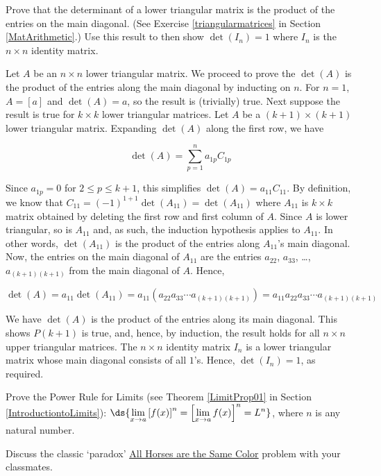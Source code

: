 \documentclass{ximera}
\begin{document}
\begin{problem}
    
Prove that the determinant of a lower triangular matrix is the product of the entries on the main diagonal.  (See Exercise \ref{triangularmatrices} in Section \ref{MatArithmetic}.)  Use this result to then show $\det\left(I_{n}\right) = 1$ where $I_{n}$ is the $n \times n$ identity matrix.

\begin{solution}
Let $A$ be an $n \times n$ lower triangular matrix.  We proceed to prove the $\det(A)$ is the product of the entries along the main diagonal by inducting on $n$.  For $n=1$, $A = [a]$ and $\det(A) = a$, so the result is (trivially) true.  Next suppose the result is true for $k \times k$ lower triangular matrices.  Let $A$ be a $(k+1) \times (k+1)$ lower triangular matrix.  Expanding $\det(A)$ along the first row, we have

\[ \det(A)  = \displaystyle{\sum_{p=1}^{n} a_{1p} C_{1p}} \]

Since $a_{1p} = 0$ for $2 \leq p \leq k+1$, this simplifies $\det(A) = a_{11}C_{11}$.  By definition, we know that $C_{11} = (-1)^{1+1} \det\left(A_{11}\right) =\det\left(A_{11}\right)$ where $A_{11}$ is $k \times k$  matrix obtained by deleting the first row and first column of $A$. Since $A$ is lower triangular, so is $A_{11}$ and, as such, the induction hypothesis applies to $A_{11}$. In other words, $\det\left(A_{11}\right)$ is the product of the entries along $A_{11}$'s main diagonal.  Now, the entries on the main diagonal of $A_{11}$ are the entries $a_{22}$, $a_{33}$, \ldots, $a_{(k+1)(k+1)}$ from the main diagonal of $A$.  Hence,

\[ \det(A) = a_{11} \det\left(A_{11}\right) = a_{11} \left(a_{22}a_{33} \cdots a_{(k+1)(k+1)} \right) = a_{11} a_{22}a_{33} \cdots a_{(k+1)(k+1)}\]

We have $\det(A)$ is the product of the entries along its main diagonal.  This shows $P(k+1)$ is true, and, hence, by induction, the result holds for all $n \times n$ upper triangular matrices. The $n \times n$ identity matrix $I_{n}$ is a lower triangular matrix whose main diagonal consists of all $1$'s.  Hence,  $\det\left(I_{n}\right) = 1$, as required.
\end{solution}
\end{problem}

\begin{problem}\label{limitpowerruleproof}
    Prove the Power Rule for Limits (see Theorem \ref{LimitProp01} in Section \ref{IntroductiontoLimits}): $\ds{\lim_{x \rightarrow a} \left[f(x)\right]^{n} = \left[\lim_{x \rightarrow a} f(x) \right]^{n}= L^{n}}$, where $n$ is any natural number.
\end{problem}

\begin{problem}
    Discuss the classic  `paradox' \href{http://en.wikipedia.org/wiki/All_horses_are_the_same_color}{\underline{All Horses are the Same Color}} problem with your classmates.
\end{problem}
\end{document}
